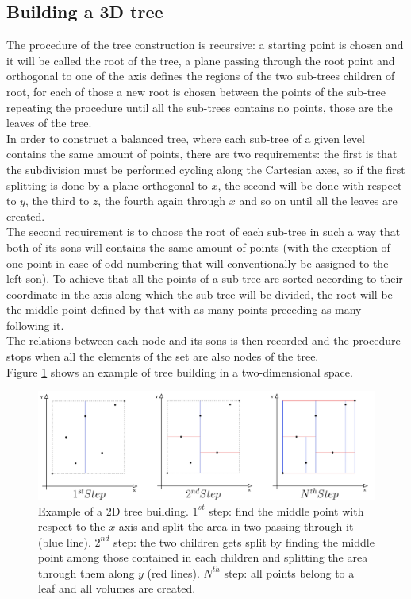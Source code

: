 \subsection{Building a 3D tree}
The procedure of the tree construction is recursive: a starting point is chosen and it will be called the root of the tree, a plane passing through the root point and orthogonal to one of the axis defines the regions of the two sub-trees children of root, for each of those a new root is chosen between the points of the sub-tree repeating the procedure until all the sub-trees contains no points, those are the leaves of the tree.\\
In order to construct a balanced tree, where each sub-tree of a given level contains the same amount of points, there are two requirements: the first is that the subdivision must be performed cycling along the Cartesian axes, so if the first splitting is done by a plane orthogonal to $x$, the second will be done with respect to $y$, the third to $z$, the fourth again through $x$ and so on until all the leaves are created.\\
The second requirement is to choose the root of each sub-tree in such a way that both of its sons will contains the same amount of points (with the exception of one point in case of odd numbering that will conventionally be assigned to the left son). To achieve that all the points of a sub-tree are sorted according to their coordinate in the axis along which the sub-tree will be divided, the root will be the middle point defined by that with as many points preceding as many following it.\\
The relations between each node and its sons is then recorded and the procedure stops when all the elements of the set are also nodes of the tree.\\
Figure \ref{kdtree_build} shows an example of tree building in a two-dimensional space.\\

\begin{figure}
\includegraphics[width=\textwidth]{volumeKdPlot/scheme_volume_kdtree.png}
\caption{Example of a 2D tree building. $1^{st}$ step: find the middle point with respect to the $x$ axis and split the area in two passing through it (blue line). $2^{nd}$ step: the two children gets split by finding the middle point among those contained in each children and splitting the area through them along $y$ (red lines). $N^{th}$ step: all points belong to a leaf and all volumes are created.}
\label{kdtree_build}
\end{figure}

